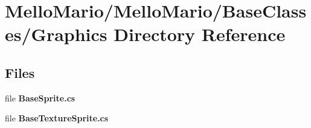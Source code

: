 \section{Mello\+Mario/\+Mello\+Mario/\+Base\+Classes/\+Graphics Directory Reference}
\label{dir_2c2f1a842a7aef795e77c89abcab436e}
\subsection*{Files}
\begin{DoxyCompactItemize}
\item 
file \textbf{ Base\+Sprite.\+cs}
\item 
file \textbf{ Base\+Texture\+Sprite.\+cs}
\end{DoxyCompactItemize}
